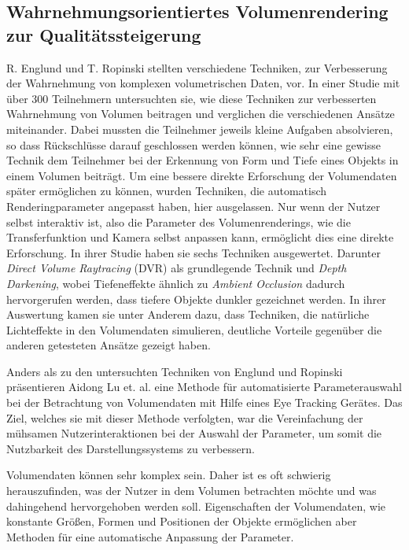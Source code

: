 \subsection{Wahrnehmungsorientiertes Volumenrendering zur Qualitätssteigerung}\label{ss::wovrzq}
R. Englund und T. Ropinski \cite{doi:10.1111/cgf.13320} stellten verschiedene Techniken, zur Verbesserung der Wahrnehmung von komplexen volumetrischen Daten, vor.
In einer Studie mit über 300 Teilnehmern untersuchten sie, wie diese Techniken zur verbesserten Wahrnehmung von Volumen beitragen und verglichen die verschiedenen Ansätze miteinander.
Dabei mussten die Teilnehmer jeweils kleine Aufgaben absolvieren, so dass Rückschlüsse darauf geschlossen werden können, wie sehr eine gewisse Technik dem Teilnehmer bei der Erkennung von Form und Tiefe eines Objekts in einem Volumen beiträgt.
Um eine bessere direkte Erforschung der Volumendaten später ermöglichen zu können, wurden Techniken, die automatisch Renderingparameter angepasst haben, hier ausgelassen.
Nur wenn der Nutzer selbst interaktiv ist, also die Parameter des Volumenrenderings, wie die Transferfunktion und Kamera selbst anpassen kann, ermöglicht dies eine direkte Erforschung.
In ihrer Studie haben sie sechs Techniken ausgewertet.
Darunter \emph{Direct Volume Raytracing} (DVR) als grundlegende Technik und \emph{Depth Darkening}, wobei Tiefeneffekte ähnlich zu \emph{Ambient Occlusion} dadurch hervorgerufen werden, dass tiefere Objekte dunkler gezeichnet werden. 
In ihrer Auswertung kamen sie unter Anderem dazu, dass Techniken, die natürliche Lichteffekte in den Volumendaten simulieren, deutliche Vorteile gegenüber die anderen getesteten Ansätze gezeigt haben.

Anders als zu den untersuchten Techniken von Englund und Ropinski \cite{doi:10.1111/cgf.13320} präsentieren Aidong Lu et. al. \cite{Lu:2006:VCU:2384796.2384814} eine Methode für automatisierte Parameterauswahl bei der Betrachtung von Volumendaten mit Hilfe eines Eye Tracking Gerätes.
Das Ziel, welches sie mit dieser Methode verfolgten, war die Vereinfachung der mühsamen Nutzerinteraktionen bei der Auswahl der Parameter, um somit die Nutzbarkeit des Darstellungssystems zu verbessern.

Volumendaten können sehr komplex sein.
Daher ist es oft schwierig herauszufinden, was der Nutzer in dem Volumen betrachten möchte und was dahingehend hervorgehoben werden soll.
Eigenschaften der Volumendaten, wie konstante Größen, Formen und Positionen der Objekte ermöglichen aber Methoden für eine automatische Anpassung der Parameter.

